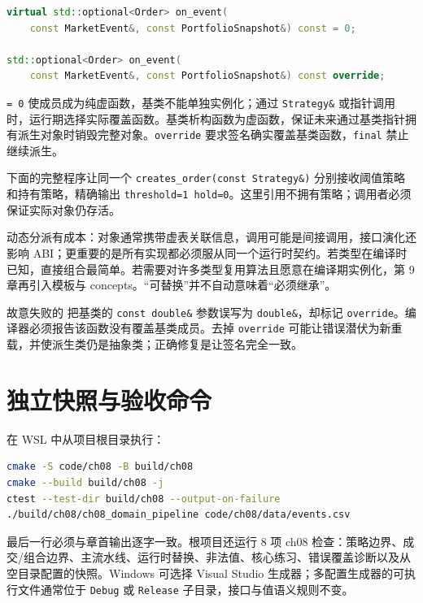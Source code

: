 \begin{lstlisting}[language=C++]
virtual std::optional<Order> on_event(
    const MarketEvent&, const PortfolioSnapshot&) const = 0;

std::optional<Order> on_event(
    const MarketEvent&, const PortfolioSnapshot&) const override;
\end{lstlisting}

\texttt{= 0} 使成员成为纯虚函数，基类不能单独实例化；通过 \texttt{Strategy\&} 或指针调用时，运行期选择实际覆盖函数。基类析构函数为虚函数，保证未来通过基类指针拥有派生对象时销毁完整对象。\texttt{override} 要求签名确实覆盖基类函数，\texttt{final} 禁止继续派生。

下面的完整程序让同一个 \texttt{creates\_order(const Strategy\&)} 分别接收阈值策略和持有策略，精确输出 \texttt{threshold=1 hold=0}。这里引用不拥有策略；调用者必须保证实际对象仍存活。



动态分派有成本：对象通常携带虚表关联信息，调用可能是间接调用，接口演化还影响 ABI；更重要的是所有实现都必须服从同一个运行时契约。若类型在编译时已知，直接组合最简单。若需要对许多类型复用算法且愿意在编译期实例化，第 9 章再引入模板与 concepts。“可替换”并不自动意味着“必须继承”。

故意失败的  把基类的 \texttt{const double\&} 参数误写为 \texttt{double\&}，却标记 \texttt{override}。编译器必须报告该函数没有覆盖基类成员。去掉 \texttt{override} 可能让错误潜伏为新重载，并使派生类仍是抽象类；正确修复是让签名完全一致。

\section{独立快照与验收命令}

在 WSL 中从项目根目录执行：

\begin{lstlisting}[language=bash]
cmake -S code/ch08 -B build/ch08
cmake --build build/ch08 -j
ctest --test-dir build/ch08 --output-on-failure
./build/ch08/ch08_domain_pipeline code/ch08/data/events.csv
\end{lstlisting}

最后一行必须与章首输出逐字一致。根项目还运行 8 项 ch08 检查：策略边界、成交/组合边界、主流水线、运行时替换、非法值、核心练习、错误覆盖诊断以及从空目录配置的快照。Windows 可选择 Visual Studio 生成器；多配置生成器的可执行文件通常位于 \texttt{Debug} 或 \texttt{Release} 子目录，接口与值语义规则不变。

